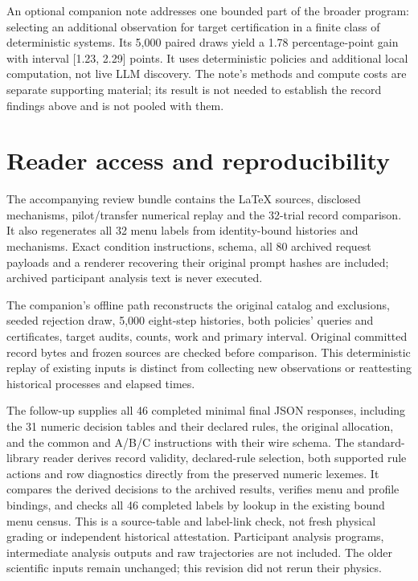 An optional companion note addresses one bounded part of the broader program:
selecting an additional observation for target certification in a finite class
of deterministic systems. Its 5,000 paired draws yield a 1.78 percentage-point
gain with interval [1.23, 2.29] points. It uses deterministic policies and
additional local computation, not live LLM discovery. The note's methods and
compute costs are separate supporting material; its result is not needed to
establish the record findings above and is not pooled with them.

\section{Reader access and reproducibility}
\label{sec:reader-access}
The accompanying review bundle contains the LaTeX sources, disclosed
mechanisms, pilot/transfer numerical replay and the 32-trial record comparison.
It also regenerates all 32 menu labels from identity-bound histories and
mechanisms. Exact condition instructions, schema, all 80 archived request
payloads and a renderer recovering their original prompt hashes are included;
archived participant analysis text is never executed.

The companion's offline path reconstructs the original catalog and exclusions,
seeded rejection draw, 5,000 eight-step histories, both policies' queries and
certificates, target audits, counts, work and primary interval. Original
committed record bytes and frozen sources are checked before comparison.
This deterministic replay of existing inputs is distinct from collecting new
observations or reattesting historical processes and elapsed times.

The follow-up supplies all 46 completed minimal final JSON responses,
including the 31 numeric decision tables and their declared rules, the
original allocation, and the common and A/B/C instructions with their wire
schema. The standard-library reader derives record validity, declared-rule
selection, both supported rule actions and row diagnostics directly from
the preserved numeric lexemes. It compares the derived decisions to the
archived results, verifies menu and profile bindings, and checks all 46
completed labels by lookup in the existing bound menu census. This is a
source-table and label-link check, not fresh physical grading or independent
historical attestation. Participant analysis programs, intermediate analysis
outputs and raw trajectories are not included. The older scientific inputs
remain unchanged; this revision did not rerun their physics.

